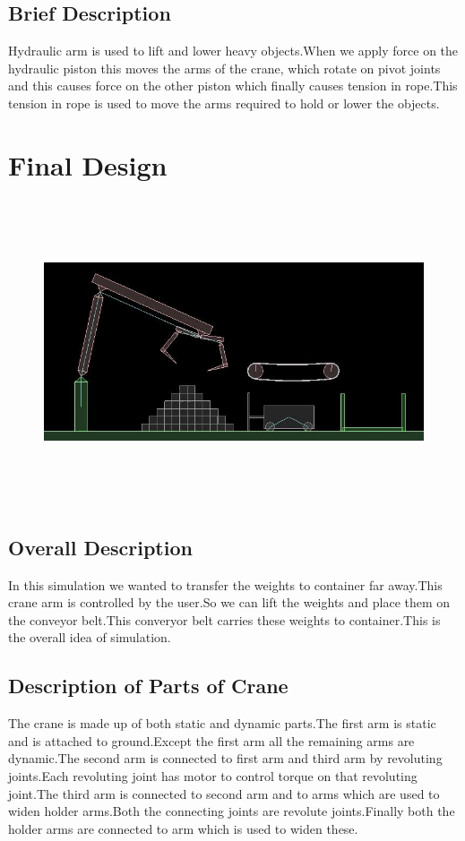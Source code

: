 \documentclass[11pt]{article}
\begin{document}
\subsection{Brief Description}
Hydraulic arm is used to lift and lower heavy objects.When we apply force on the hydraulic piston this moves the arms of the crane, which rotate on pivot joints and this causes force on the other piston which finally causes tension in rope.This tension in rope is used to move the arms required to hold or lower the objects.
\section{Final Design}

\begin{figure}[ht!]
\centering
\includegraphics[height=9cm]{final.jpg}
\end{figure}

\subsection{Overall Description}
In this simulation we wanted to transfer the weights to container far away.This crane arm is controlled by the user.So we can lift the weights and place them on the conveyor belt.This converyor belt carries these weights to container.This is the overall idea of simulation.
\subsection{Description of Parts of Crane}
The crane is made up of both static and dynamic parts.The first arm is static and is attached to ground.Except the first arm all the remaining arms are dynamic.The second arm is connected to first arm and third arm by revoluting joints.Each revoluting joint has motor to control torque on that revoluting joint.The third arm is connected to second arm and to arms which are used to widen holder arms.Both the connecting joints are revolute joints.Finally both the holder arms are connected to arm which is used to widen these.
\end{document}
